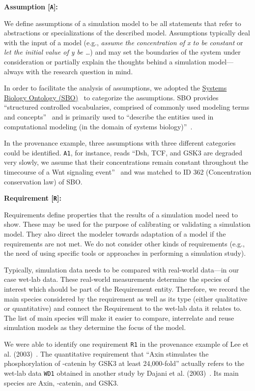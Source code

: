 \documentclass[10pt,letterpaper]{article}
\newcommand{\bcat}{\textbeta-catenin}
\newcommand{\lee}{Lee et al. (2003)}
\newcommand{\A}{Assumption}
\newcommand{\R}{Requirement}
\begin{document}
\textbf{\A{} [\texttt{A}]:}

\noindent We define assumptions of a simulation model to be all statements that refer to abstractions or specializations of the described model.
Assumptions typically deal with the input of a model (e.g., \textit{assume the concentration of x to be constant} or \textit{let the initial value of y be \ldots}) and may set the boundaries of the system under consideration or partially explain the thoughts behind a simulation model---always with the research question in mind.

In order to facilitate the analysis of assumptions, we adopted the \href{https://www.ebi.ac.uk/sbo/main/}{Systems Biology Ontology (SBO)}~\cite{Courtot2011} to categorize the assumptions.
SBO provides \enquote{structured controlled vocabularies, comprised of commonly used modeling terms and concepts}~\cite{Juty2013} and is primarily used to \enquote{describe the entities used in computational modeling (in the domain of systems biology)}~\cite{Courtot2011}.

In the provenance example, three assumptions with three different categories could be identified.
\texttt{A1}, for instance, reads \enquote{Dsh, TCF, and GSK3\textbeta{} are degraded very slowly, we assume that their concentrations remain constant throughout the timecourse of a Wnt signaling event}~\cite{Lee2003} and was matched to ID 362 (Concentration conservation law) of SBO.


\textbf{\R{} [\texttt{R}]:}

\noindent Requirements define properties that the results of a simulation model need to show.
These may be used for the purpose of calibrating or validating a simulation model.
They also direct the modeler towards adaptation of a model if the requirements are not met.
We do not consider other kinds of requirements (e.g., the need of using specific tools or approaches in performing a simulation study).

Typically, simulation data needs to be compared with real-world data---in our case wet-lab data.
These real-world measurements determine the species of interest which should be part of the \R{} entity.
Therefore, we record the main species considered by the requirement as well as its type (either qualitative or quantitative) and connect the \R{} to the wet-lab data it relates to.
The list of main species will make it easier to compare, interrelate and reuse simulation models as they determine the focus of the model.

We were able to identify one requirement \texttt{R1} in the provenance example of \lee{}~\cite{Lee2003}.
The quantitative requirement that \enquote{Axin stimulates the phosphorylation of \bcat{} by GSK3\textbeta{} at least 24,000-fold} actually refers to the wet-lab data \texttt{WD1} obtained in another study by Dajani et al. (2003)~\cite{Dajani2003}.
Its main species are Axin, \bcat{}, and GSK3\textbeta.
\end{document}
